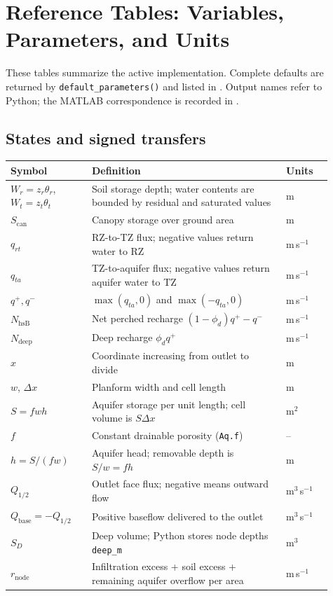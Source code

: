 \documentclass[12pt]{article}
\begin{document}


\section{Reference Tables: Variables, Parameters, and Units}
\label{sec:ref_tables}
These tables summarize the active implementation. Complete defaults are returned by \texttt{default\_parameters()} and listed in . Output names refer to Python; the MATLAB correspondence is recorded in .

\subsection*{States and signed transfers}
\begin{longtable}{@{}p{0.23\linewidth}p{0.55\linewidth}p{0.13\linewidth}@{}}
\toprule
Symbol & Definition & Units \\ \midrule
$W_r=z_r\theta_r$, $W_t=z_t\theta_t$ & Soil storage depth; water contents are bounded by residual and saturated values & m \\
$S_{\mathrm{can}}$ & Canopy storage over ground area & m \\
$q_{rt}$ & RZ-to-TZ flux; negative values return water to RZ & m\,s$^{-1}$ \\
$q_{ta}$ & TZ-to-aquifer flux; negative values return aquifer water to TZ & m\,s$^{-1}$ \\
$q^+,q^-$ & $\max(q_{ta},0)$ and $\max(-q_{ta},0)$ & m\,s$^{-1}$ \\
$N_{\mathrm{hsB}}$ & Net perched recharge $(1-\phi_d)q^+-q^-$ & m\,s$^{-1}$ \\
$N_{\mathrm{deep}}$ & Deep recharge $\phi_d q^+$ & m\,s$^{-1}$ \\
$x$ & Coordinate increasing from outlet to divide & m \\
$w$, $\Delta x$ & Planform width and cell length & m \\
$S=fwh$ & Aquifer storage per unit length; cell volume is $S\Delta x$ & m$^2$ \\
$f$ & Constant drainable porosity (\texttt{Aq.f}) & -- \\
$h=S/(fw)$ & Aquifer head; removable depth is $S/w=fh$ & m \\
$Q_{1/2}$ & Outlet face flux; negative means outward flow & m$^3$\,s$^{-1}$ \\
$Q_{\mathrm{base}}=-Q_{1/2}$ & Positive baseflow delivered to the outlet & m$^3$\,s$^{-1}$ \\
$S_D$ & Deep volume; Python stores node depths \texttt{deep\_m} & m$^3$ \\
$r_{\mathrm{node}}$ & Infiltration excess + soil excess + remaining aquifer overflow per area & m\,s$^{-1}$ \\
\bottomrule
\end{longtable}
\end{document}
